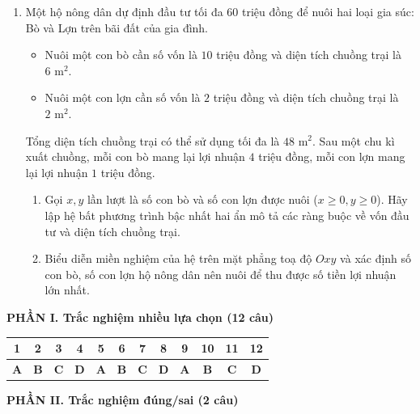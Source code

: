 \documentclass[12pt,a4paper]{article}
\newcommand{\parttitle}[1]{\par\vspace{1.5pt}\needspace{2\baselineskip}{\large\bfseries\color{ink}#1}\par\nopagebreak\vspace{1pt}}
\begin{document}
\begin{enumerate}
\item Một hộ nông dân dự định đầu tư tối đa $60$ triệu đồng để nuôi hai loại gia súc: Bò và Lợn trên bãi đất của gia đình.
\begin{itemize}[leftmargin=1.5em, itemsep=0.1pt]
    \item Nuôi một con bò cần số vốn là $10$ triệu đồng và diện tích chuồng trại là $6\text{ m}^2$.
    \item Nuôi một con lợn cần số vốn là $2$ triệu đồng và diện tích chuồng trại là $2\text{ m}^2$.
\end{itemize}
Tổng diện tích chuồng trại có thể sử dụng tối đa là $48\text{ m}^2$. Sau một chu kì xuất chuồng, mỗi con bò mang lại lợi nhuận $4$ triệu đồng, mỗi con lợn mang lại lợi nhuận $1$ triệu đồng.
\begin{enumerate}
    \item Gọi $x, y$ lần lượt là số con bò và số con lợn được nuôi ($x \ge 0, y \ge 0$). Hãy lập hệ bất phương trình bậc nhất hai ẩn mô tả các ràng buộc về vốn đầu tư và diện tích chuồng trại.
    \item Biểu diễn miền nghiệm của hệ trên mặt phẳng toạ độ $Oxy$ và xác định số con bò, số con lợn hộ nông dân nên nuôi để thu được số tiền lợi nhuận lớn nhất.
\end{enumerate}
\end{enumerate}

\newpage

\pagestyle{dapan}
\parttitle{BẢNG ĐÁP ÁN TỔNG HỢP}

\vspace{0.2cm}
\noindent\textbf{PHẦN I. Trắc nghiệm nhiều lựa chọn (12 câu)}
\vspace{0.15cm}

\begin{center}
\begin{tabular}{|c|c|c|c|c|c|c|c|c|c|c|c|}
\hline
\textbf{1} & \textbf{2} & \textbf{3} & \textbf{4} & \textbf{5} & \textbf{6} & \textbf{7} & \textbf{8} & \textbf{9} & \textbf{10} & \textbf{11} & \textbf{12} \\
\hline
\textbf{A} & \textbf{B} & \textbf{C} & \textbf{D} & \textbf{A} & \textbf{B} & \textbf{C} & \textbf{D} & \textbf{A} & \textbf{B} & \textbf{C} & \textbf{D} \\
\hline
\end{tabular}
\end{center}

\vspace{0.3cm}
\noindent\textbf{PHẦN II. Trắc nghiệm đúng/sai (2 câu)}
\vspace{0.15cm}
\end{document}
